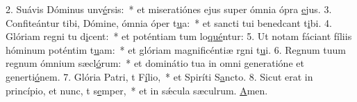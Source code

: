 2. Suávis Dóminus unv\uline{é}rsis:~* et miseratiónes ejus super ómnia ópra \uline{e}jus.
3. Confiteántur tibi, Dómine, ómnia óper t\uline{u}a:~* et sancti tui benedcant t\uline{i}bi.
4. Glóriam regni tu d\uline{i}cent:~* et poténtiam tum lo\uline{qué}ntur:
5. Ut notam fáciant fíliis hóminum poténtim t\uline{u}am:~* et glóriam magnificéntiæ rgni t\uline{u}i.
6. Regnum tuum regnum ómnium sæcl\uline{ó}rum:~* et dominátio tua in omni generatióne et generti\uline{ó}nem.
7. Glória Patri, t F\uline{í}lio,~* et Spiríti S\uline{a}ncto.
8. Sicut erat in princípio, et nunc, t s\uline{e}mper,~* et in sǽcula sæculrum. \uline{A}men.
